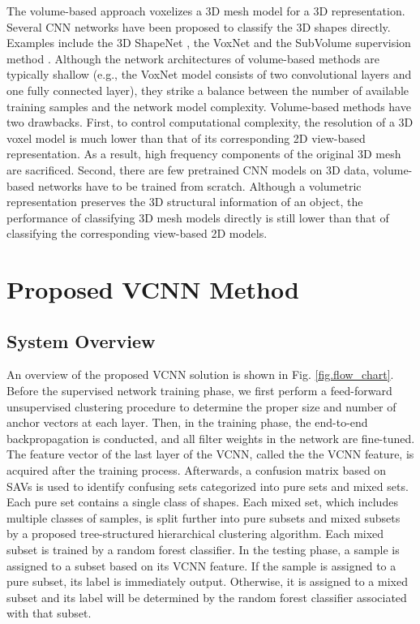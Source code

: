 \documentclass[preprint,12pt]{elsarticle}
\begin{document}
The volume-based approach voxelizes a 3D mesh model for a 3D
representation. Several CNN networks have been proposed to classify the
3D shapes directly. Examples include the 3D ShapeNet \cite{wu20153d},
the VoxNet \cite{maturana2015voxnet} and the SubVolume supervision
method \cite{qi2016volumetric}. Although the network architectures of
volume-based methods are typically shallow (e.g., the VoxNet model
consists of two convolutional layers and one fully connected layer),
they strike a balance between the number of available training samples
and the network model complexity. Volume-based methods have two
drawbacks.  First, to control computational complexity, the resolution
of a 3D voxel model is much lower than that of its corresponding 2D
view-based representation.  As a result, high frequency components of
the original 3D mesh are sacrificed. Second, there are few pretrained
CNN models on 3D data, volume-based networks have to be trained from
scratch.  Although a volumetric representation preserves the 3D
structural information of an object, the performance of classifying 3D
mesh models directly is still lower than that of classifying the
corresponding view-based 2D models. 

\section{Proposed VCNN Method}\label{sec.VCNN}

\subsection{System Overview} \label{sec.overview}

An overview of the proposed VCNN solution is shown in Fig.
\ref{fig.flow_chart}. Before the supervised network training phase, we
first perform a feed-forward unsupervised clustering procedure to
determine the proper size and number of anchor vectors at each layer.
Then, in the training phase, the end-to-end backpropagation is
conducted, and all filter weights in the network are fine-tuned. The
feature vector of the last layer of the VCNN, called the the VCNN
feature, is acquired after the training process.  Afterwards, a
confusion matrix based on SAVs is used to identify confusing sets
categorized into pure sets and mixed sets. Each pure set contains a
single class of shapes. Each mixed set, which includes multiple classes
of samples, is split further into pure subsets and mixed subsets by a
proposed tree-structured hierarchical clustering algorithm. Each mixed
subset is trained by a random forest classifier.  In the testing phase,
a sample is assigned to a subset based on its VCNN feature. If the
sample is assigned to a pure subset, its label is immediately output.
Otherwise, it is assigned to a mixed subset and its label will be
determined by the random forest classifier associated with that subset. 
\end{document}
